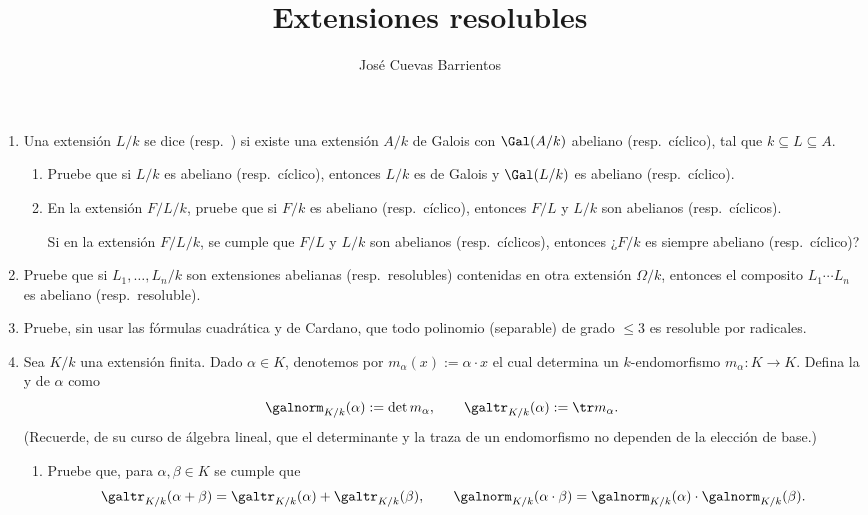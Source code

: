 \documentclass[11pt, reqno]{amsart}
\title{Extensiones resolubles}
\date{\DTMdate{2025-04-10}}
\author{José Cuevas Barrientos}
\begin{document}
\maketitle

\nocite{nagata:fields}
\nocite{lang:algebra}

\begin{enumerate}
	\item Una extensión $L/k$ se dice  (resp.\ ) si existe una extensión
		$A/k$ de Galois con $\Gal(A/k)$ abeliano (resp.\ cíclico), tal que $k \subseteq L \subseteq A$.

		\begin{enumerate}
			\item Pruebe que si $L/k$ es abeliano (resp.\ cíclico), entonces $L/k$ es de Galois y
				$\Gal(L/k)$ es abeliano (resp.\ cíclico).
			\item En la extensión $F/L/k$, pruebe que si $F/k$ es abeliano (resp.\ cíclico), entonces $F/L$
				y $L/k$ son abelianos (resp.\ cíclicos).

				\begin{prob}
					\lookup
					Si en la extensión $F/L/k$, se cumple que $F/L$ y $L/k$ son abelianos (resp.\
					cíclicos), entonces ¿$F/k$ es siempre abeliano (resp.\ cíclico)?
				\end{prob}
		\end{enumerate}

	\item Pruebe que si $L_1, \dots, L_n / k$ son extensiones abelianas (resp.\ resolubles) contenidas en otra
		extensión $\Omega/k$, entonces el composito $L_1 \cdots L_n$ es abeliano (resp.\ resoluble).

	\item\lookright
		Pruebe, sin usar las fórmulas cuadrática y de Cardano, que todo polinomio (separable) de grado
		$\le 3$ es resoluble por radicales.

	\item Sea $K/k$ una extensión finita.
		Dado $\alpha \in K$, denotemos por $m_\alpha(x) := \alpha\cdot x$ el cual determina un $k$-endomorfismo
		$m_\alpha \colon K \to K$.
		Defina la  y  de $\alpha$ como
		\[
			\galnorm_{K/k}(\alpha) := \det m_\alpha, \qquad \galtr_{K/k}(\alpha) := \tr m_\alpha.
		\]
		(Recuerde, de su curso de álgebra lineal, que el determinante y la traza de un endomorfismo no dependen
		de la elección de base.)
		\begin{enumerate}
			\item Pruebe que, para $\alpha, \beta \in K$ se cumple que
				\[
					\galtr_{K/k}(\alpha + \beta) = \galtr_{K/k}(\alpha) + \galtr_{K/k}(\beta),
					\qquad
					\galnorm_{K/k}(\alpha \cdot \beta) = \galnorm_{K/k}(\alpha) \cdot \galnorm_{K/k}(\beta).
				\]


\end{enumerate}
\end{enumerate}
\end{document}
